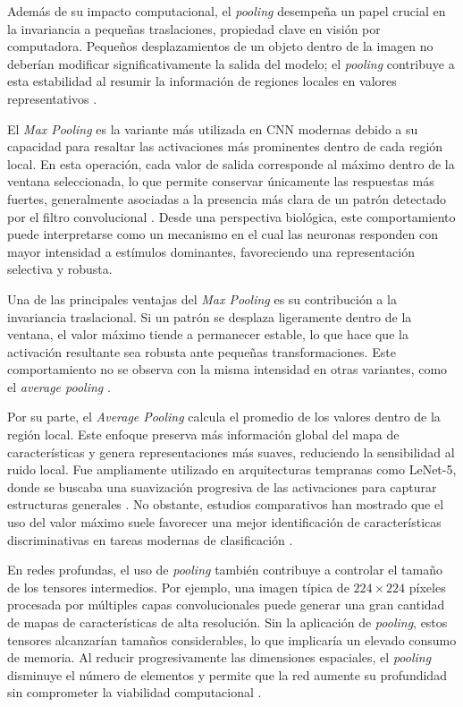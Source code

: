 	Además de su impacto computacional, el \textit{pooling} desempeña un papel crucial en la invariancia a pequeñas traslaciones, propiedad clave en visión por computadora. Pequeños desplazamientos de un objeto dentro de la imagen no deberían modificar significativamente la salida del modelo; el \textit{pooling} contribuye a esta estabilidad al resumir la información de regiones locales en valores representativos \cite{scherer2010}.
	
	El \textit{Max Pooling} es la variante más utilizada en CNN modernas debido a su capacidad para resaltar las activaciones más prominentes dentro de cada región local. En esta operación, cada valor de salida corresponde al máximo dentro de la ventana seleccionada, lo que permite conservar únicamente las respuestas más fuertes, generalmente asociadas a la presencia más clara de un patrón detectado por el filtro convolucional \cite{scherer2010}. Desde una perspectiva biológica, este comportamiento puede interpretarse como un mecanismo en el cual las neuronas responden con mayor intensidad a estímulos dominantes, favoreciendo una representación selectiva y robusta.
	
	Una de las principales ventajas del \textit{Max Pooling} es su contribución a la invariancia traslacional. Si un patrón se desplaza ligeramente dentro de la ventana, el valor máximo tiende a permanecer estable, lo que hace que la activación resultante sea robusta ante pequeñas transformaciones. Este comportamiento no se observa con la misma intensidad en otras variantes, como el \textit{average pooling} \cite{goodfellow2016dl}.
	
	Por su parte, el \textit{Average Pooling} calcula el promedio de los valores dentro de la región local. Este enfoque preserva más información global del mapa de características y genera representaciones más suaves, reduciendo la sensibilidad al ruido local. Fue ampliamente utilizado en arquitecturas tempranas como LeNet-5, donde se buscaba una suavización progresiva de las activaciones para capturar estructuras generales \cite{lecun1998}. No obstante, estudios comparativos han mostrado que el uso del valor máximo suele favorecer una mejor identificación de características discriminativas en tareas modernas de clasificación \cite{scherer2010}.
	
	En redes profundas, el uso de \textit{pooling} también contribuye a controlar el tamaño de los tensores intermedios. Por ejemplo, una imagen típica de $224 \times 224$ píxeles procesada por múltiples capas convolucionales puede generar una gran cantidad de mapas de características de alta resolución. Sin la aplicación de \textit{pooling}, estos tensores alcanzarían tamaños considerables, lo que implicaría un elevado consumo de memoria. Al reducir progresivamente las dimensiones espaciales, el \textit{pooling} disminuye el número de elementos y permite que la red aumente su profundidad sin comprometer la viabilidad computacional \cite{goodfellow2016dl}.
	
